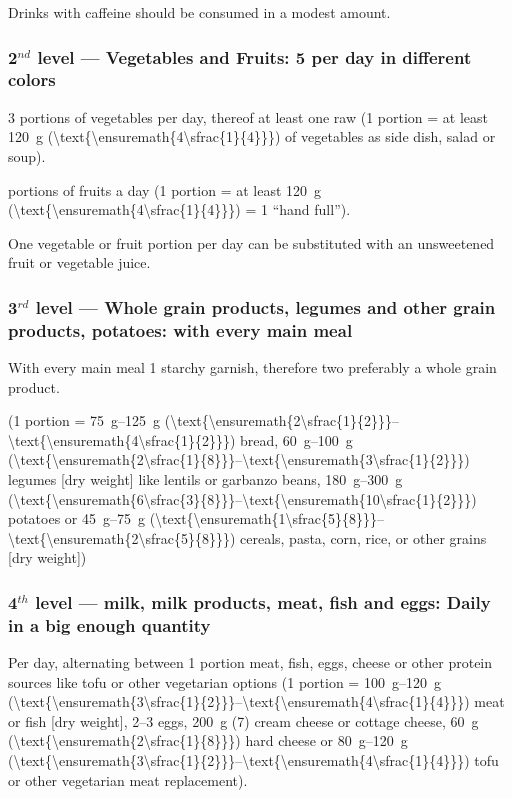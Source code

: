\documentclass[../main.tex]{subfiles}
\begin{document}
\noindent Drinks with caffeine should be consumed in a modest amount.

\subsubsection{2$^{nd}$ level --- Vegetables and Fruits: 5 per day in different colors}

3 portions of vegetables per day, thereof at least one raw (1 portion = at least \SI{120}{\gram} (\SI[parse-numbers=false]{\text{\ensuremath{4\sfrac{1}{4}}}}{\oz})
of vegetables as side dish, salad or soup).

 portions of fruits a day (1 portion = at least  \SI{120}{\gram}
(\SI[parse-numbers=false]{\text{\ensuremath{4\sfrac{1}{4}}}}{\oz}) = 1 ``hand full'').

\noindent One vegetable or fruit portion per day can be substituted with an unsweetened fruit or vegetable juice.

\subsubsection{3$^{rd}$ level --- Whole grain products, legumes and other grain products, potatoes: with every main meal}

With every main meal 1 starchy garnish, therefore two preferably a whole grain product.

(1 portion = \SIrange{75}{125}{\gram}
(\SIrange[parse-numbers=false]{\text{\ensuremath{2\sfrac{1}{2}}}}{\text{\ensuremath{4\sfrac{1}{2}}}}{\oz}) bread,
\SIrange{60}{100}{\gram}
(\SIrange[parse-numbers=false]{\text{\ensuremath{2\sfrac{1}{8}}}}{\text{\ensuremath{3\sfrac{1}{2}}}}{\oz})
legumes [dry weight] like lentils or garbanzo beans,
\SIrange{180}{300}{\gram}
(\SIrange[parse-numbers=false]{\text{\ensuremath{6\sfrac{3}{8}}}}{\text{\ensuremath{10\sfrac{1}{2}}}}{\oz}) potatoes
or \SIrange{45}{75}{\gram}
(\SIrange[parse-numbers=false]{\text{\ensuremath{1\sfrac{5}{8}}}}{\text{\ensuremath{2\sfrac{5}{8}}}}{\oz})
cereals, pasta, corn, rice, or other grains [dry weight])

\subsubsection{4$^{th}$ level --- milk, milk products, meat, fish and eggs: Daily in a big enough quantity}

Per day, alternating between 1 portion meat, fish, eggs, cheese or other protein sources like tofu or other vegetarian options
(1 portion = \SIrange{100}{120}{\gram}
(\SIrange[parse-numbers=false]{\text{\ensuremath{3\sfrac{1}{2}}}}{\text{\ensuremath{4\sfrac{1}{4}}}}{\oz}) meat or fish [dry weight],
2--3 eggs, \SI{200}{\gram} (\SI{7}{\oz}) cream cheese or cottage cheese,
\SI{60}{\gram} (\SI[parse-numbers=false]{\text{\ensuremath{2\sfrac{1}{8}}}}{\oz}) hard cheese
or \SIrange{80}{120}{\gram}
(\SIrange[parse-numbers=false]{\text{\ensuremath{3\sfrac{1}{2}}}}{\text{\ensuremath{4\sfrac{1}{4}}}}{\oz})
tofu or other vegetarian meat replacement).
\end{document}
